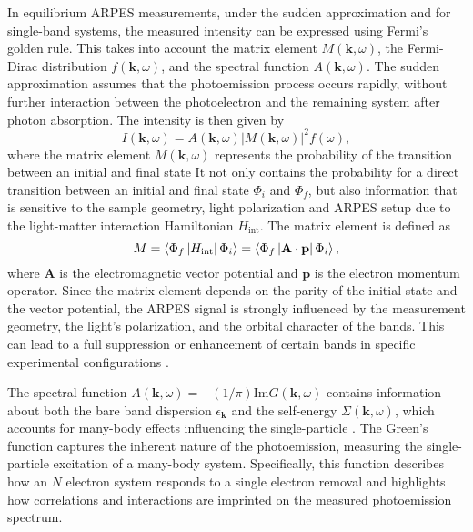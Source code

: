 In equilibrium ARPES measurements, under the sudden approximation and for single-band systems, the measured intensity can be expressed using Fermi's golden rule.
This takes into account the matrix element $M(\mathbf{k}, \omega)$, the Fermi-Dirac distribution $f(\mathbf{k}, \omega)$, and the spectral function $A(\mathbf{k}, \omega)$.
The sudden approximation assumes that the photoemission process occurs rapidly, without further interaction between the photoelectron and the remaining system after photon absorption.
The intensity is then given by
\begin{equation}
	I(\mathbf{k}, \omega) = A(\mathbf{k}, \omega)\left|M(\mathbf{k}, \omega)\right|^2f(\omega),
	\label{eq:spectral}
\end{equation}
where the matrix element $M(\mathbf{k}, \omega)$ represents the probability of the transition between an initial and final state
It not only contains the probability for a direct transition between an initial and final state $\Phi_i$ and $\Phi_f$, but also information that is sensitive to the sample geometry, light polarization and ARPES setup due to the light-matter interaction Hamiltonian $H_\text{int}$.
The matrix element is defined as
\begin{equation}
	M = \braket{\Phi_f\left|H_\text{int}\right|\Phi_i} = \braket{\Phi_f\left| \mathbf{A} \cdot \mathbf{p} \right|\Phi_i},
\end{equation}
where $\mathbf{A}$ is the electromagnetic vector potential and $\mathbf{p}$ is the electron momentum operator.
Since the matrix element depends on the parity of the initial state and the vector potential, the ARPES signal is strongly influenced by the measurement geometry, the light's polarization, and the orbital character of the bands.
This can lead to a full suppression or enhancement of certain bands in specific experimental configurations \cite{gierz_illuminating_2011, cao_mapping_2013,zhu_layer-by-layer_2013,schuler_polarization-modulated_2022}.

The spectral function $A(\mathbf{k}, \omega) = -(1/\pi)\text{Im}G(\mathbf{k}, \omega)$ contains information about both the bare band dispersion $\epsilon_\mathbf{k}$ and the self-energy $\Sigma(\mathbf{k}, \omega)$, which accounts for many-body effects influencing the single-particle \cite{mahan_many-particle_2000}.
The Green's function captures the inherent nature of the photoemission, measuring the single-particle excitation of a many-body system.
Specifically, this function describes how an $N$ electron system responds to a single electron removal and highlights how correlations and interactions are imprinted on the measured photoemission spectrum.

